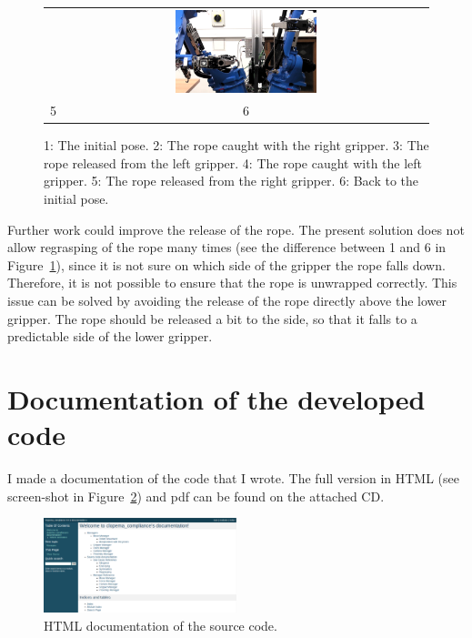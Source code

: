 \begin{figure}[h]
\begin{tabular}{c|c}
            &
            \includegraphics[width=0.4\textwidth]{Img/regrasping/SwitchArmsRight.png} \\
            5 & 6 \\

            \end{tabular}
            \caption{1: The initial pose. 2: The rope caught with the right gripper. 3: The rope released from the left gripper. 4: The rope caught with the left gripper. 5: The rope released from the right gripper. 6: Back to the initial pose.}
            \label{fig:RegraspingProcess}
        \end{figure}

        Further work could improve the release of the rope. The present solution does not allow regrasping of the rope many times (see the difference between 1 and 6 in Figure~\ref{fig:RegraspingProcess}), since it is not sure on which side of the gripper the rope falls down. Therefore, it is not possible to ensure that the rope is unwrapped correctly. This issue can be solved by avoiding the release of the rope directly above the lower gripper. The rope should be released a bit to the side, so that it falls to a predictable side of the lower gripper.

    \section{Documentation of the developed code}
        I made a documentation of the code that I wrote. The full version in HTML (see screen-shot in Figure~\ref{fig:DocHTML}) and pdf can be found on the attached CD.

        \begin{figure}[h!]
        \includegraphics[width=0.5\textwidth]{Img/conclusion/DocHTML.png}
        \centering
        \caption{HTML documentation of the source code.}
        \label{fig:DocHTML}
        \end{figure}

